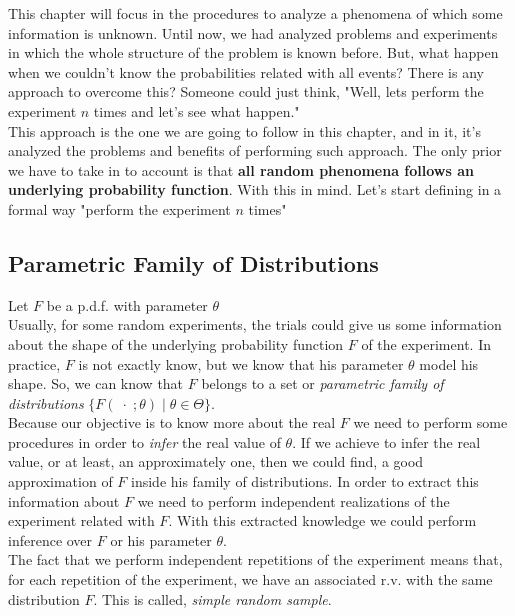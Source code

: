 This chapter will focus in the procedures to analyze a phenomena of which some information is unknown. Until now,
we had analyzed problems and experiments in which the whole structure of the problem is known before. But, what
happen when we couldn't know the probabilities related with all events? There is any approach to overcome this?
Someone could just think, "Well, lets perform the experiment $n$ times and let's see what happen."\\

This approach is the one we are going to follow in this chapter, and in it, it's analyzed the problems and benefits
of performing such approach. The only prior we have to take in to account is that 
\textbf{all random phenomena follows an underlying probability function}. With this in mind. Let's start defining in 
a formal way "perform the experiment $n$ times"

\subsection{Parametric Family of Distributions}
Let $F$ be a p.d.f. with parameter $\theta$\\

Usually, for some random experiments, the trials could give us some information about the shape of the underlying
probability function $F$ of the experiment. In practice, $F$ is not exactly know, but we know that his parameter 
$\theta$ model his shape. So, we can know that $F$ belongs to a set or \textit{parametric family of distributions}
$\{F(\;\cdot\;;\theta)\; |\; \theta \in \Theta\}$.\\

Because our objective is to know more about the real $F$ we need to perform some procedures in order to \textit{infer}
the real value of $\theta$. If we achieve to infer the real value, or at least, an approximately one, then we could find,
a good approximation of $F$ inside his family of distributions. In order to extract this information about $F$ we need
to perform independent realizations of the experiment related with $F$. With this extracted knowledge we could perform
inference over $F$ or his parameter $\theta$.\\

The fact that we perform independent repetitions of the experiment means that, for each repetition of the experiment, 
we have an associated r.v. with the same distribution $F$. This is called, \textit{simple random sample}.

